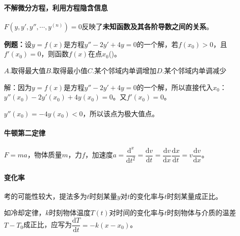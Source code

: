 \paragraph{不解微分方程，利用方程隐含信息}

$F(y,y',y'',\cdots,y^{(n)})=0$反映了\textbf{未知函数及其各阶导数之间的关系}。

\textbf{例题：}设$y=f(x)$是方程$y''-2y'+4y=0$的一个解，若$f(x_0)>0$，且$f'(x_0)=0$，则函数$f(x)$在点$x_0$()。

$A.$取得最大值\qquad$B.$取得最小值\qquad$C.$某个邻域内单调增加\qquad$D.$某个邻域内单调减少

解：因为$y=f(x)$是方程$y''-2y'+4y=0$的一个解，所以直接代入$x_0$：$y''(x_0)-2y'(x_0)+4y(x_0)=0$。又$f'(x_0)=0$。

$y''(x_0)=-4y(x_0)<0$，所以该点为极大值点。

\paragraph{}

\paragraph{}

\paragraph{牛顿第二定律}

$F=ma$，物体质量$m$，力$f$，加速度$a=\dfrac{\textrm{d}^x}{\textrm{d}t^2}=\dfrac{\textrm{d}v}{\textrm{d}t}=\dfrac{\textrm{d}v}{\textrm{d}x}\dfrac{\textrm{d}x}{\textrm{d}t}=v\dfrac{\textrm{d}v}{\textrm{d}x}$。

\paragraph{变化率}

考的可能性较大，提法多为$t$时刻某量$y$对$t$的变化率与$t$时刻某量成正比。

如冷却定律，$k$时刻物体温度$T(t)$对时间的变化率与$t$时刻物体与介质的温差$T-T_0$成正比，应写为$\dfrac{\textrm{d}T}{\textrm{d}t}=-k(x-x_0)$。
